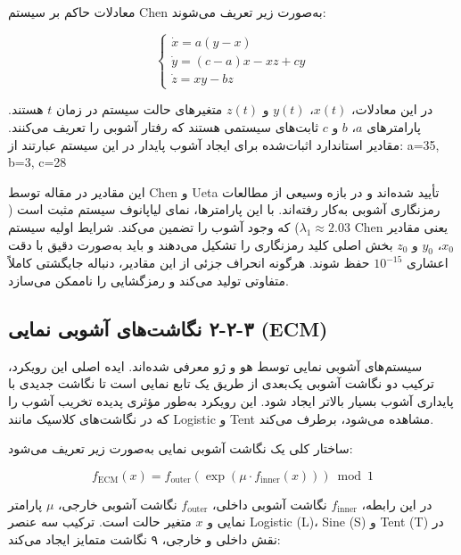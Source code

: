 معادلات حاکم بر سیستم Chen به‌صورت زیر تعریف می‌شوند:

\begin{equation}

\begin{cases}
\dot{x} = a(y-x) \\
\dot{y} = (c-a)x - xz + cy \\
\dot{z} = xy - bz
\end{cases}
\end{equation}

در این معادلات، $x(t)$، $y(t)$ و $z(t)$ متغیرهای حالت سیستم در زمان $t$ هستند. پارامترهای $a$، $b$ و $c$ ثابت‌های سیستمی هستند که رفتار آشوبی را تعریف می‌کنند. مقادیر استاندارد اثبات‌شده برای ایجاد آشوب پایدار در این سیستم عبارتند از: a=35, b=3, c=28

این مقادیر در مقاله \cite{ref6} توسط Chen و Ueta تأیید شده‌اند و در بازه وسیعی از مطالعات رمزنگاری آشوبی به‌کار رفته‌اند. با این پارامترها، نمای لیاپانوف سیستم مثبت است ($\lambda_1 \approx 2.03$) که وجود آشوب را تضمین می‌کند. شرایط اولیه سیستم Chen یعنی مقادیر $x_0$، $y_0$ و $z_0$ بخش اصلی کلید رمزنگاری را تشکیل می‌دهند و باید به‌صورت دقیق با دقت اعشاری $10^{-15}$ حفظ شوند. هرگونه انحراف جزئی از این مقادیر، دنباله جایگشتی کاملاً متفاوتی تولید می‌کند و رمزگشایی را ناممکن می‌سازد.

\subsection{‏۳‏-‏۲‏-‏۲‏ نگاشت‌های آشوبی نمایی (ECM)}

سیستم‌های آشوبی نمایی توسط هو و ژو \cite{ref4}معرفی شده‌اند. ایده اصلی این رویکرد، ترکیب دو نگاشت آشوبی یک‌بعدی از طریق یک تابع نمایی است تا نگاشت جدیدی با پایداری آشوب بسیار بالاتر ایجاد شود. این رویکرد به‌طور مؤثری پدیده تخریب آشوب را که در نگاشت‌های کلاسیک مانند Logistic و Tent مشاهده می‌شود، برطرف می‌کند.

ساختار کلی یک نگاشت آشوبی نمایی به‌صورت زیر تعریف می‌شود:

\begin{equation}

f_{\mathrm{ECM}}(x) = f_{\mathrm{outer}}\!\left(\exp(\mu \cdot f_{\mathrm{inner}}(x))\right) \bmod 1
\end{equation}

در این رابطه، $f_{\mathrm{inner}}$ نگاشت آشوبی داخلی، $f_{\mathrm{outer}}$ نگاشت آشوبی خارجی، $\mu$ پارامتر نمایی و $x$ متغیر حالت است. ترکیب سه عنصر Logistic (L)، Sine (S) و Tent (T) در نقش داخلی و خارجی، ۹ نگاشت متمایز ایجاد می‌کند:

